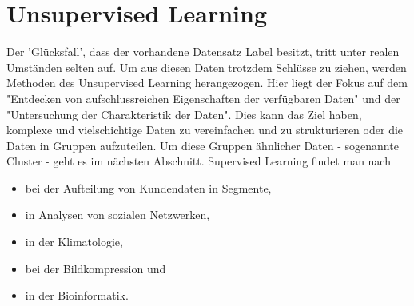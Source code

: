 \section{Unsupervised Learning}\label{sec:us1}
Der 'Glücksfall', dass der vorhandene Datensatz Label besitzt, tritt unter realen Umständen selten auf. Um aus diesen Daten trotzdem Schlüsse zu ziehen, werden Methoden des Unsupervised Learning herangezogen. Hier liegt der Fokus auf dem "Entdecken von aufschlussreichen Eigenschaften der verfügbaren Daten"\citep[S.277; eigene Übersetzung]{kubat_introduction_2017} und der "Untersuchung der Charakteristik der Daten"\citep[S.~13; eigene Übersetzung]{kim_matlab_2017}. Dies kann das Ziel haben, komplexe und vielschichtige Daten zu vereinfachen und zu strukturieren\citep{ericson_how_2017} oder die Daten in Gruppen aufzuteilen\citep[S.~22]{lison_introduction_2012}. Um diese Gruppen ähnlicher Daten - sogenannte Cluster - geht es im nächsten Abschnitt.\newline
Supervised Learning findet man nach \citep[S.~223]{ramasubramanian_machine_2017}
\begin{itemize}
\item bei der Aufteilung von Kundendaten in Segmente,
\item in Analysen von sozialen Netzwerken,
\item in der Klimatologie,
\item bei der Bildkompression und
\item in der Bioinformatik.\citep[S.~6]{kauchak_neural_2016}
\end{itemize}

